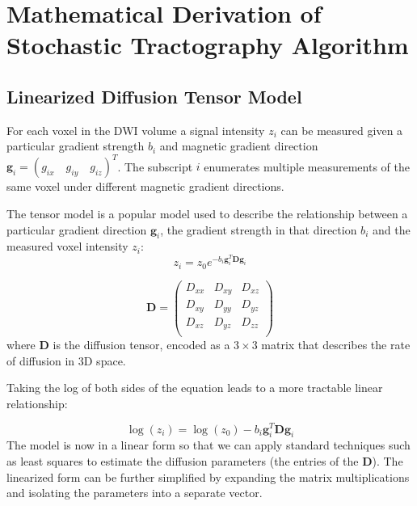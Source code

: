 \chapter{Mathematical Derivation of Stochastic Tractography Algorithm}
\section{Linearized Diffusion Tensor Model}
For each voxel in the DWI volume a signal intensity $z_i$ can be measured given a particular gradient strength $b_i$ and magnetic gradient direction $\mathbf{g}_{i}=(g_{ix} \quad g_{iy} \quad g_{iz})^T$.  The subscript $i$ enumerates multiple measurements of the same voxel under different magnetic gradient directions.

The tensor model is a popular model used to describe the relationship between a particular gradient direction $\mathbf{g}_i$, the gradient strength in that direction $b_i$ and the measured voxel intensity $z_i$:  
%
%
\begin{equation} \label{eq:tensormodel}
z_{i}=z_0 e^{-b_i \mathbf{g}_i^T \mathbf{D} \mathbf{g}_i}
\end{equation}


\begin{equation} \label{eq:Dtensor}
\mathbf{D}=
\left( \begin{array}{ccc}
D_{xx} & D_{xy} & D_{xz} \\
D_{xy} & D_{yy} & D_{yz} \\
D_{xz} & D_{yz} & D_{zz} \\
\end{array} \right)
\end{equation}
%
%
where $\mathbf{D}$ is the diffusion tensor, encoded as a $3\times3$ matrix that describes the rate of diffusion in 3D space.  


Taking the log of both sides of the equation leads to a more tractable linear relationship:

\begin{equation} \label{eq:logtensormodel}
\log(z_i)=\log(z_0)-b_i \mathbf{g}_i^T \mathbf{D} \mathbf{g}_i
\end{equation}
%
%
The model is now in a linear form so that we can apply standard techniques such as least squares to estimate the diffusion parameters (the entries of the $\mathbf{D}$).  The linearized form can be further simplified by expanding the matrix multiplications and isolating the parameters into a separate vector.

